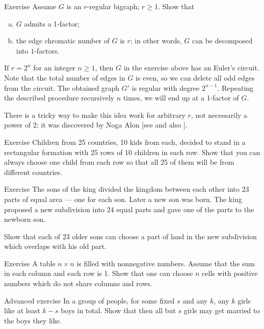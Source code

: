 \begin{thm}{Exercise}
Assume $G$ is an $r$-regular bigraph; $r\ge 1$.
Show that 
\begin{enumerate}[(a)]
\item $G$ admits a 1-factor;
\item the edge chromatic number of $G$ is $r$; in other words, $G$ can be decomposed into $1$-factors.
\end{enumerate}

\end{thm}

If $r=2^n$ for an integer $n\ge 1$, then $G$ in the exercise above has an Euler's circuit. 
Note that the total number of edges in $G$ is even, so we can delete all odd edges from the circuit.
The obtained graph $G'$ is regular with degree $2^{n-1}$.
Repeating the described procedure recursively $n$ times, 
we will end up at a 1-factor of $G$.

There is a tricky way to make this idea work for arbitrary $r$, not necessarily a power of $2$; 
it was discovered by Noga Alon [see  and also ]. 

\begin{thm}{Exercise}
Children from 25 countries, 10 kids from each, decided to stand in a rectangular formation with 25 rows of 10 children in each row.
Show that you can always choose one child from each row so that all 25 of them will be from different countries.
\end{thm}

\begin{thm}{Exercise}
The sons of the king divided the kingdom between each other into 23 parts of equal area --- one for each son.
Later a new son was born. 
The king proposed a new subdivision into 24 equal parts and gave one of the parts to the newborn son.

Show that each of 23 older sons can choose a part of land in the new subdivision which overlaps with his old part.
\end{thm}

\begin{thm}{Exercise} A table $n{\times}n$ is filled with nonnegative numbers.
Assume that the sum in each column and each row is 1.
Show that one can choose $n$ cells with positive numbers which do not share columns and rows. 
\end{thm}


\begin{thm}{Advanced exercise}
In a group of people, for some fixed $s$ and any $k$,
any $k$ girls like at least $k-s$ boys in total.
Show that then all but $s$ girls may get married to the boys they like.
\end{thm}



